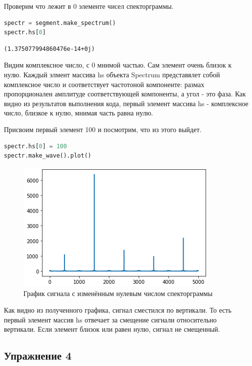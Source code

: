 Проверим что лежит в 0 элементе чисел спекторграммы.

\begin{lstlisting}[language=Python]
spectr = segment.make_spectrum()
spectr.hs[0]
\end{lstlisting}

\begin{lstlisting}
(1.375077994860476e-14+0j)
\end{lstlisting}
Видим комплексное число, с 0 мнимой частью. Сам элемент очень близок к нулю. Каждый элмент массива hs объекта Spectrum представялет собой комплексное число и соответствует частотоной компоненте: размах пропорционален амплитуде соответствующей компоненты, а угол - это фаза. Как видно из результатов выполнения кода, первый элемент массива hs - комплексное число, близкое к нулю, мнимая часть равна нулю.

\noindent Присвоим первый элемент 100 и посмотрим, что из этого выйдет.
\begin{lstlisting}[language=Python]
spectr.hs[0] = 100
spectr.make_wave().plot()
\end{lstlisting}

\begin{figure}[H]
	\begin{center}
		\includegraphics[scale=1]{fig/lab02/lab2_7.png}
		\caption{График сигнала с изменённым нулевым числом спекторграммы}
	\end{center}
\end{figure}

Как видно из полученного графика, сигнал сместился по вертикали. То есть первый элемент массив hs отвечает за смещение сигнали относительно вертикали. Если элемент близок или равен нулю, сигнал не смещенный.

\subsection{Упражнение 4}

